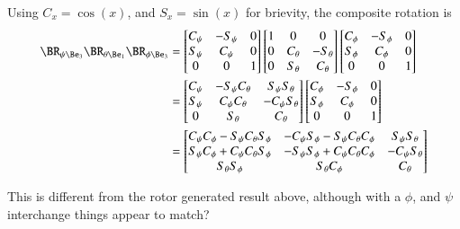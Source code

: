 \documentclass{article}
\begin{document}
Using $C_x = \cos(x)$, and $S_x = \sin(x)$ for brievity, the composite rotation is
\begin{align*}
\BR_{\psi \Be_3} \BR_{\theta \Be_1} \BR_{\phi \Be_3} 
&=
\begin{bmatrix}
C_\psi & - S_\psi & 0 \\
S_\psi & C_\psi & 0 \\
0 & 0 & 1 \\
\end{bmatrix} 
\begin{bmatrix}
1 & 0 & 0 \\
0 & C_\theta & - S_\theta \\
0 & S_\theta & C_\theta \\
\end{bmatrix} 
\begin{bmatrix}
C_\phi & - S_\phi & 0 \\
S_\phi & C_\phi & 0 \\
0 & 0 & 1 \\
\end{bmatrix} \\
&=
\begin{bmatrix}
C_\psi & - S_\psi C_\theta & S_\psi S_\theta \\
S_\psi & C_\psi C_\theta & -C_\psi S_\theta \\
0 & S_\theta & C_\theta \\
\end{bmatrix} 
\begin{bmatrix}
C_\phi & - S_\phi & 0 \\
S_\phi & C_\phi & 0 \\
0 & 0 & 1 \\
\end{bmatrix} \\
&=
\begin{bmatrix}
C_\psi C_\phi - S_\psi C_\theta S_\phi & -C_\psi S_\phi - S_\psi C_\theta C_\phi &   S_\psi S_\theta \\
S_\psi C_\phi + C_\psi C_\theta S_\phi & -S_\psi S_\phi + C_\psi C_\theta C_\phi & - C_\psi S_\theta \\
                       S_\theta S_\phi &                         S_\theta C_\phi &          C_\theta \\
\end{bmatrix} \\
\end{align*}

This is different from the rotor generated result above, although with a $\phi$, and $\psi$ interchange things appear to match?
\end{document}
